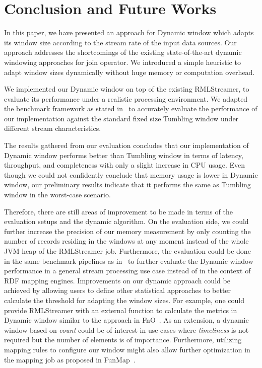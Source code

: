 \chapter{Conclusion and Future Works}%
\label{chap:Conclusion and Future Works}


In this paper, we have presented an approach for Dynamic window 
which adapts its window size according to the stream rate of the 
input data sources. Our approach addresses the shortcomings of 
the existing state-of-the-art dynamic windowing approaches for 
join operator. We introduced a simple heuristic to adapt 
window sizes dynamically without huge memory or computation overhead. 

We implemented our Dynamic window on top of the existing RMLStreamer, 
to evaluate its performance under a realistic processing environment. 
We adapted the benchmark framework as stated in~\cite{evalution_of_spe} to 
accurately evaluate the performance of our implementation against the 
standard fixed size Tumbling window under different stream characteristics. 

The results gathered from our evaluation concludes that our implementation 
of Dynamic window performs better than Tumbling window in terms of 
latency, throughput, and completeness with only a slight 
increase in CPU usage. Even though we could not confidently conclude that
memory usage is lower in Dynamic window, our preliminary results indicate 
that it performs the same as Tumbling window in the worst-case scenario.

Therefore, there are still areas of improvement to be made in terms of the
evaluation setups
and the dynamic algorithm. On the evaluation side, we could further increase 
the precision of our memory measurement by only counting the number of records
residing in the windows at any moment instead of the whole JVM heap of the RMLStreamer job. 
Furthermore, the evaluation could be done in the same benchmark pipelines as in~\cite{evalution_of_spe} 
to further evaluate the Dynamic window performance in a general stream processing use case instead 
of in the context of RDF mapping engines.  
Improvements on our dynamic approach could be achieved by allowing users to 
define other statistical approaches
to better calculate the threshold for adapting the window sizes. For example, one could provide 
RMLStreamer with an external function to calculate the metrics in Dynamic window similar to the approach 
in FnO~\cite{fno_ben}.
As an extension, a dynamic window based on \emph{count} could be of interest in use 
cases where \emph{timeliness} is not required but the number of elements is of importance.
Furthermore, utilizing mapping rules to configure our window might also allow further
optimization in the mapping job as proposed in FunMap~\cite{funmap}. 


